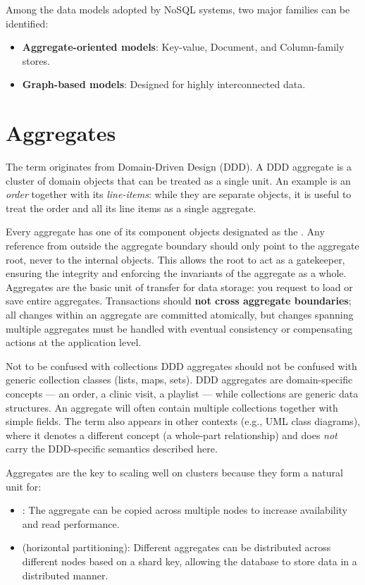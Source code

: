 Among the data models adopted by NoSQL systems, two major families can be identified:
\begin{itemize}
    \item \textbf{Aggregate-oriented models}: Key-value, Document, and Column-family stores.
    \item \textbf{Graph-based models}: Designed for highly interconnected data.
\end{itemize}

\section{Aggregates}
The term  originates from Domain-Driven Design (DDD)\cite{evans2003ddd}. A DDD aggregate is a cluster of domain objects that can be treated as a single unit. An example is an \emph{order} together with its \emph{line-items}: while they are separate objects, it is useful to treat the order and all its line items as a single aggregate\cite{fowler2013aggregate}.

Every aggregate has one of its component objects designated as the . Any reference from outside the aggregate boundary should only point to the aggregate root, never to the internal objects. This allows the root to act as a gatekeeper, ensuring the integrity and enforcing the invariants of the aggregate as a whole. Aggregates are the basic unit of transfer for data storage: you request to load or save entire aggregates. Transactions should \textbf{not cross aggregate boundaries}; all changes within an aggregate are committed atomically, but changes spanning multiple aggregates must be handled with eventual consistency or compensating actions at the application level.

\begin{warning}{Not to be confused with collections}
    DDD aggregates should not be confused with generic collection classes (lists, maps, sets). DDD aggregates are domain-specific concepts --- an order, a clinic visit, a playlist --- while collections are generic data structures. An aggregate will often contain multiple collections together with simple fields. The term  also appears in other contexts (e.g., UML class diagrams), where it denotes a different concept (a whole-part relationship) and does \emph{not} carry the DDD-specific semantics described here.
\end{warning}

Aggregates are the key to scaling well on clusters because they form a natural unit for:
\begin{itemize}
    \item {}: The aggregate can be copied across multiple nodes to increase availability and read performance.
    \item {} (horizontal partitioning): Different aggregates can be distributed across different nodes based on a shard key, allowing the database to store data in a distributed manner.
\end{itemize}

